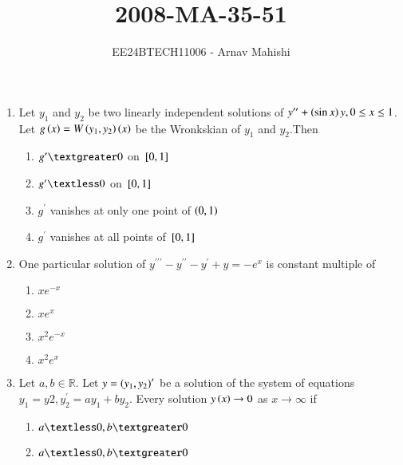\documentclass[journal]{IEEEtran}
\begin{document}

\vspace{3cm}

\title{2008-MA-35-51}
\author{EE24BTECH11006 - Arnav Mahishi}
{\let\newpage\relax\maketitle}
\begin{enumerate}
\item{
Let $y_1$ and $y_2$ be two linearly independent solutions of $y^{\prime\prime}+\left(\sin x\right)y,0\leq x\leq1$. Let $g\left(x\right)=W\left(y_1,y_2\right)\left(x\right)$ be the Wronkskian of $y_1$ and $y_2$.Then   
\begin{multicols}{2}
\begin{enumerate}
\item$g^{\prime}\textgreater0$ on ${}\left[0,1\right]$
\item$g^{\prime}\textless0$ on ${}\left[0,1\right]$
\item$g^{\prime}$ vanishes at only one point of $\left(0,1\right)$
\item$g^{\prime}$ vanishes at all points of ${}\left[0,1\right]$
\end{enumerate}
\end{multicols}
}
\item{
One particular solution of $y^{\prime\prime\prime}-y^{\prime\prime}-y^{\prime}+y=-e^x$ is constant multiple of 
\begin{multicols}{4}
\begin{enumerate}
\item $xe^{-x}$
\item $xe^x$
\item $x^2e^{-x}$
\item $x^2e^x$
\end{enumerate}
\end{multicols}}
\item{
Let $a,b\in\mathbb{R}$. Let $y=\left(y_1,y_2\right)^{\prime}$ be a solution of the system of equations $y_1=y2,y_2^{\prime}=ay_1+by_2$. Every solution $y\left(x\right)\rightarrow 0$ as $x\rightarrow\infty$ if
\begin{multicols}{4}
\begin{enumerate}
\item $a\textless0,b\textgreater0$
\item $a\textless0,b\textgreater0$

\end{enumerate}
\end{multicols}}
\end{enumerate}
\end{document}
